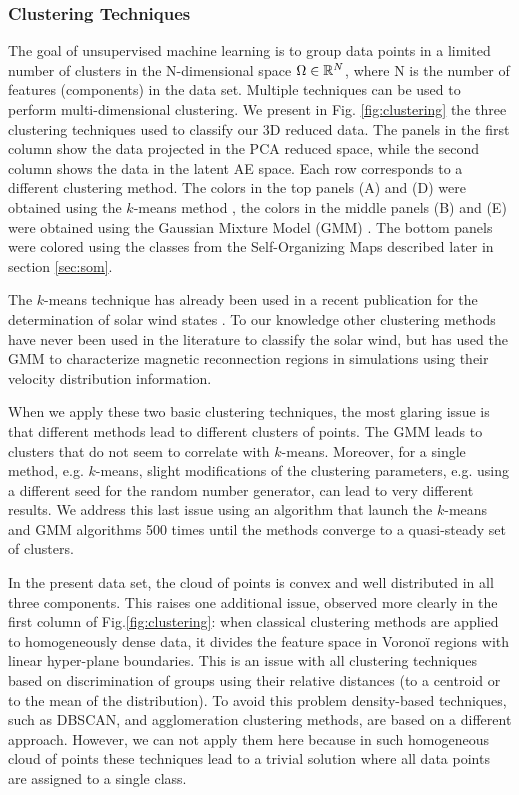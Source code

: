 \subsubsection{Clustering Techniques}
\label{sec:clustering}
The goal of unsupervised machine learning is to group data points in a limited number of clusters in the N-dimensional space $\Omega\in\Bbb R^N$, where N is the number of features (components) in the data set. Multiple techniques can be used to perform multi-dimensional clustering. We present in Fig. \ref{fig:clustering} the three clustering techniques used to classify our 3D reduced data. The panels in the first column show the data projected in the PCA reduced space, while the second column shows the data in the latent AE space. Each row corresponds to a different clustering method. The colors in the top panels (A) and (D) were obtained using the $k$-means method \citep{1056489}, the colors in the middle panels (B) and (E) were obtained using the Gaussian Mixture Model (GMM) \citep{bishop2006machine}. The bottom panels were colored using the classes from the Self-Organizing Maps described later in section \ref{sec:som}.

The $k$-means technique has already been used in a recent publication for the determination of solar wind states \citep{Roberts2020}. To our knowledge other clustering methods have never been used in the literature to classify the solar wind, but \citep{Dupuis2020} has used the GMM to characterize magnetic reconnection regions in simulations using their velocity distribution information.

When we apply these two basic clustering techniques, the most glaring issue is that different methods lead to different clusters of points. The GMM leads to clusters that do not seem to correlate with $k$-means. Moreover, for a single method, e.g. $k$-means, slight modifications of the clustering parameters, e.g. using a different seed for the random number generator, can lead to very different results. We address this last issue using an algorithm that launch the $k$-means and GMM algorithms 500 times until the methods converge to a quasi-steady set of clusters.

In the present data set, the cloud of points is convex and well distributed in all three components. This raises one additional issue, observed more clearly in the first column of Fig.\ref{fig:clustering}: when classical clustering methods are applied to homogeneously dense data, it divides the feature space in Vorono\"i regions with linear hyper-plane boundaries. This is an issue with all clustering techniques based on discrimination of groups using their relative distances (to a centroid or to the mean of the distribution). To avoid this problem density-based techniques, such as DBSCAN\citep{ester1996density}, and agglomeration clustering methods, are based on a different approach. However, we can not apply them here because in such homogeneous cloud of points these techniques lead to a trivial solution where all data points are assigned to a single class.

